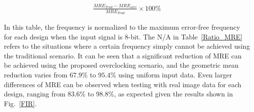 \documentclass[prodmode,acmtrets]{acmsmall} %
\begin{document}
\begin{eqnarray}\label{Relative Reduction MRE}
  \frac{MRE_{Trad}-MRE_{ovrc}}{MRE_{Trad}}\times 100\%
\end{eqnarray}

In this table, the frequency is normalized to the maximum error-free frequency for each design when the input signal is 8-bit. The N/A in Table~\ref{Ratio_MRE} refers to the situations where a certain frequency simply cannot be achieved using the traditional scenario. It can be seen that a significant reduction of MRE can be achieved using the proposed overclocking scenario, and the geometric mean reduction varies from $67.9\%$ to $95.4\%$ using uniform input data. Even larger differences of MRE can be observed when testing with real image data for each design, ranging from $83.6\%$ to $98.8\%$, as expected given the results shown in Fig.~\ref{FIR}.
\end{document}
